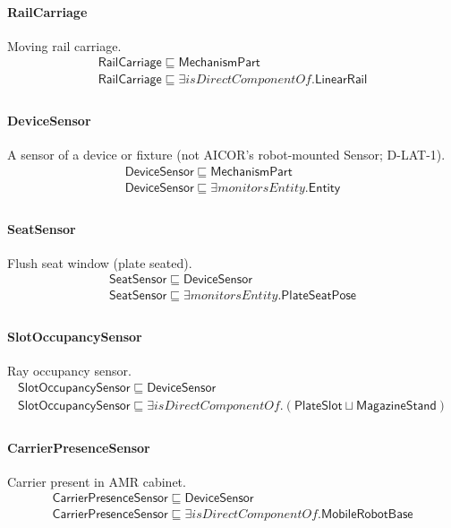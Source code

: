 \documentclass[10pt]{article}
\begin{document}
\paragraph{RailCarriage} Moving rail carriage.
\[\begin{array}{l}
\mathsf{RailCarriage} \sqsubseteq  \mathsf{MechanismPart} \\
\mathsf{RailCarriage} \sqsubseteq  \exists \mathit{isDirectComponentOf}.\mathsf{LinearRail} \\
\end{array}\]
\paragraph{DeviceSensor} A sensor of a device or fixture (not AICOR's robot-mounted Sensor; D-LAT-1).
\[\begin{array}{l}
\mathsf{DeviceSensor} \sqsubseteq  \mathsf{MechanismPart} \\
\mathsf{DeviceSensor} \sqsubseteq  \exists \mathit{monitorsEntity}.\mathsf{Entity} \\
\end{array}\]
\paragraph{SeatSensor} Flush seat window (plate seated).
\[\begin{array}{l}
\mathsf{SeatSensor} \sqsubseteq  \mathsf{DeviceSensor} \\
\mathsf{SeatSensor} \sqsubseteq  \exists \mathit{monitorsEntity}.\mathsf{PlateSeatPose} \\
\end{array}\]
\paragraph{SlotOccupancySensor} Ray occupancy sensor.
\[\begin{array}{l}
\mathsf{SlotOccupancySensor} \sqsubseteq  \mathsf{DeviceSensor} \\
\mathsf{SlotOccupancySensor} \sqsubseteq  \exists \mathit{isDirectComponentOf}.(\mathsf{PlateSlot} \sqcup  \mathsf{MagazineStand}) \\
\end{array}\]
\paragraph{CarrierPresenceSensor} Carrier present in AMR cabinet.
\[\begin{array}{l}
\mathsf{CarrierPresenceSensor} \sqsubseteq  \mathsf{DeviceSensor} \\
\mathsf{CarrierPresenceSensor} \sqsubseteq  \exists \mathit{isDirectComponentOf}.\mathsf{MobileRobotBase} \\
\end{array}\]
\end{document}
